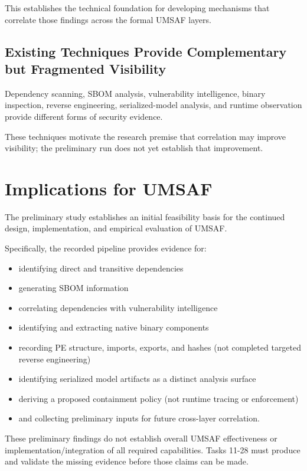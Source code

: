 \documentclass[
  12pt,
  letterpaper,
  oneside]{report}
\providecommand{\tightlist}{%
  \setlength{\itemsep}{0pt}\setlength{\parskip}{0pt}}
\begin{document}
This establishes the technical foundation for developing mechanisms that
correlate those findings across the formal UMSAF layers.

\subsection{Existing Techniques Provide Complementary but Fragmented Visibility}\label{7-existing-techniques-provide-complementary-but-fragmented-visibility}

Dependency scanning, SBOM analysis, vulnerability intelligence, binary
inspection, reverse engineering, serialized-model analysis, and runtime
observation provide different forms of security evidence.

These techniques motivate the research premise that correlation may
improve visibility; the preliminary run does not yet establish that
improvement.

\section{Implications for UMSAF}\label{911-implications-for-umsaf}

The preliminary study establishes an initial feasibility basis for the
continued design, implementation, and empirical evaluation of UMSAF.

Specifically, the recorded pipeline provides evidence for:

\begin{itemize}
\tightlist
\item
  identifying direct and transitive dependencies
\item
  generating SBOM information
\item
  correlating dependencies with vulnerability intelligence
\item
  identifying and extracting native binary components
\item
  recording PE structure, imports, exports, and hashes (not completed
  targeted reverse engineering)
\item
  identifying serialized model artifacts as a distinct analysis surface
\item
  deriving a proposed containment policy (not runtime tracing or
  enforcement)
\item
  and collecting preliminary inputs for future cross-layer correlation.
\end{itemize}

These preliminary findings do not establish overall UMSAF effectiveness
or implementation/integration of all required capabilities. Tasks 11-28
must produce and validate the missing evidence before those claims can
be made.
\end{document}
